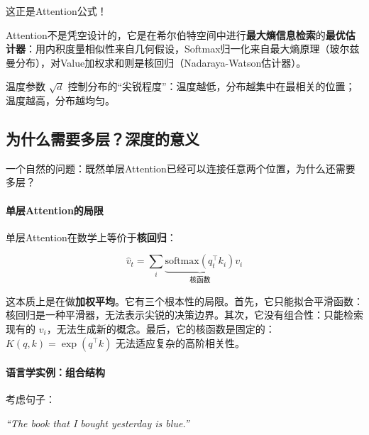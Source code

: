 这正是Attention公式！

\begin{remark}
Attention不是凭空设计的，它是在希尔伯特空间中进行\textbf{最大熵信息检索}的\textbf{最优估计器}：用内积度量相似性来自几何假设，Softmax归一化来自最大熵原理（玻尔兹曼分布），对Value加权求和则是核回归（Nadaraya-Watson估计器）。

温度参数 $\sqrt{d}$ 控制分布的“尖锐程度”：温度越低，分布越集中在最相关的位置；温度越高，分布越均匀。
\end{remark}


\subsection{为什么需要多层？深度的意义}

一个自然的问题：既然单层Attention已经可以连接任意两个位置，为什么还需要多层？

\paragraph{单层Attention的局限}


单层Attention在数学上等价于\textbf{核回归}：

\begin{equation}
    \hat{v}_t = \sum_i \underbrace{\text{softmax}(q_t^\top k_i)}_{\text{核函数}} v_i
\end{equation}

这本质上是在做\textbf{加权平均}。它有三个根本性的局限。首先，它只能拟合平滑函数：核回归是一种平滑器，无法表示尖锐的决策边界。其次，它没有组合性：只能检索现有的 $v_i$，无法生成新的概念。最后，它的核函数是固定的：$K(q, k) = \exp(q^\top k)$ 无法适应复杂的高阶相关性。

\paragraph{语言学实例：组合结构}

考虑句子：

\begin{center}
\textit{“The book that I bought yesterday is blue.”}
\end{center}

